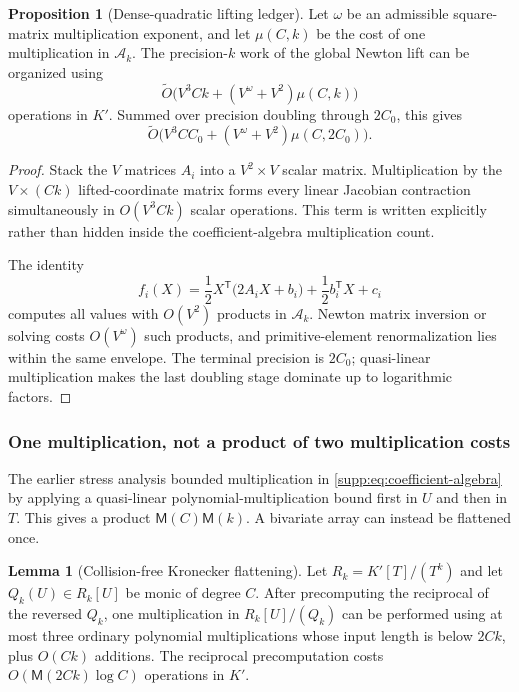 \documentclass[11pt,a4paper]{article}
\theoremstyle{definition}
\newtheorem{lemma}[theorem]{Lemma}
\newtheorem{proposition}[theorem]{Proposition}
\theoremstyle{remark}
\newcommand{\softO}{\widetilde O}
\newcommand{\Mmul}{\mathsf M}
\begin{document}
\begin{proposition}[Dense-quadratic lifting ledger]\label{supp:prop:dense-batched-ledger}
Let $\omega$ be an admissible square-matrix multiplication exponent, and let $\mu(C,k)$ be the cost of one multiplication in $\mathcal A_k$.  The precision-$k$ work of the global Newton lift can be organized using
\begin{equation}\label{supp:eq:precision-k-ledger}
 \softO\bigl(V^3Ck+(V^\omega+V^2)\mu(C,k)\bigr)
\end{equation}
operations in $K'$.  Summed over precision doubling through $2C_0$, this gives
\begin{equation}\label{supp:eq:batched-general}
 \softO\bigl(V^3CC_0+(V^\omega+V^2)\mu(C,2C_0)\bigr).
\end{equation}
\end{proposition}

\begin{proof}
Stack the $V$ matrices $A_i$ into a $V^2\times V$ scalar matrix.  Multiplication by the $V\times(Ck)$ lifted-coordinate matrix forms every linear Jacobian contraction simultaneously in $O(V^3Ck)$ scalar operations.  This term is written explicitly rather than hidden inside the coefficient-algebra multiplication count.

The identity
\[
 f_i(X)=\frac12X^{\mathsf T}\bigl(2A_iX+b_i\bigr)
       +\frac12b_i^{\mathsf T}X+c_i
\]
computes all values with $O(V^2)$ products in $\mathcal A_k$.  Newton matrix inversion or solving costs $O(V^\omega)$ such products, and primitive-element renormalization lies within the same envelope.  The terminal precision is $2C_0$; quasi-linear multiplication makes the last doubling stage dominate up to logarithmic factors.
\end{proof}

\subsubsection{One multiplication, not a product of two multiplication costs}\label{supp:sec:flat-multiplication}

The earlier stress analysis bounded multiplication in \eqref{supp:eq:coefficient-algebra} by applying a quasi-linear polynomial-multiplication bound first in $U$ and then in $T$.  This gives a product $\Mmul(C)\Mmul(k)$.  A bivariate array can instead be flattened once.

\begin{lemma}[Collision-free Kronecker flattening]\label{supp:lem:kronecker-flat}
Let
$R_k=K'[T]/(T^k)$ and let $Q_k(U)\in R_k[U]$ be monic of degree $C$.  After precomputing the reciprocal of the reversed $Q_k$, one multiplication in
$R_k[U]/(Q_k)$ can be performed using at most three ordinary polynomial multiplications whose input length is below $2Ck$, plus $O(Ck)$ additions.  The reciprocal precomputation costs
$O(\Mmul(2Ck)\log C)$ operations in $K'$.
\end{lemma}
\end{document}
